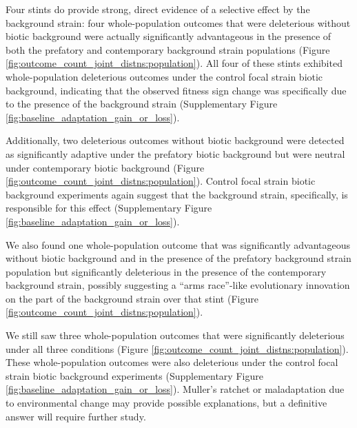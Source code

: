 Four stints do provide strong, direct evidence of a selective effect by the background strain: four whole-population outcomes that were deleterious without biotic background were actually significantly advantageous in the presence of both the prefatory and contemporary background strain populations (Figure \ref{fig:outcome_count_joint_distns:population}).
All four of these stints exhibited whole-population deleterious outcomes under the control focal strain biotic background, indicating that the observed fitness sign change was specifically due to the presence of the background strain (Supplementary Figure \ref{fig:baseline_adaptation_gain_or_loss}).

Additionally, two deleterious outcomes without biotic background were detected as significantly adaptive under the prefatory biotic background but were neutral under contemporary biotic background (Figure \ref{fig:outcome_count_joint_distns:population}).
Control focal strain biotic background experiments again suggest that the background strain, specifically, is responsible for this effect (Supplementary Figure \ref{fig:baseline_adaptation_gain_or_loss}).

We also found one whole-population outcome that was significantly advantageous without biotic background and in the presence of the prefatory background strain population but significantly deleterious in the presence of the contemporary background strain, possibly suggesting a ``arms race''-like evolutionary innovation on the part of the background strain over that stint (Figure \ref{fig:outcome_count_joint_distns:population}).

We still saw three whole-population outcomes that were significantly deleterious under all three conditions (Figure \ref{fig:outcome_count_joint_distns:population}).
These whole-population outcomes were also deleterious under the control focal strain biotic background experiments (Supplementary Figure \ref{fig:baseline_adaptation_gain_or_loss}).
Muller's ratchet \citep{andersson1996muller} or maladaptation due to environmental change \citep{brady2019causes} may provide possible explanations, but a definitive answer will require further study.

